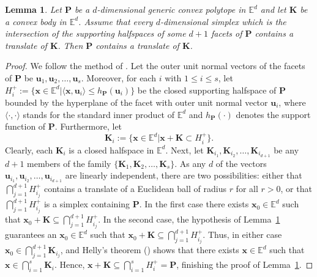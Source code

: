 \documentclass[12pt]{article}
\newtheorem{lem}{Lemma}
\newcommand{\Ee}{{\mathbb E}}
\begin{document}
\begin{lem}\label{Lutwak-type}
Let $\mathbf{P}$ be a $d$-dimensional generic convex polytope in $ \Ee^d$ and let $\mathbf{K}$ be a convex body in $ \Ee^d$. Assume that every $d$-dimensional simplex which is the intersection of the supporting halfspaces of some $d+1$ facets of $\mathbf{P}$ contains a translate of $\mathbf{K}$. Then $\mathbf{P}$ contains a translate of $\mathbf{K}$.
\end{lem} 

\begin{proof} We follow the method of \cite{Lut}. Let the outer unit normal vectors of the facets of $\mathbf{P}$ be $\mathbf{u}_1, \mathbf{u}_2, \dots , \mathbf{u}_s$. Moreover, for each $i$ with $1\leq i\leq s$, let $H_i^+:=\{\mathbf{x}\in \Ee^d | \langle \mathbf{x}, \mathbf{u}_i\rangle\leq h_{\mathbf{P}}(\mathbf{u}_i)\}$ be the closed supporting halfspace of $\mathbf{P}$ bounded by the hyperplane of the facet with outer unit normal vector $\mathbf{u}_i$, where $\langle\cdot ,\cdot\rangle$ stands for the standard inner product of  $\Ee^d$ and $h_{\mathbf{P}}(\cdot )$ denotes the support function of $\mathbf{P}$. Furthermore, let $$\mathbf{K}_i:=\{\mathbf{x}\in \Ee^d | \mathbf{x}+\mathbf{K}\subset H_i^+\}.$$ Clearly, each $\mathbf{K}_i$ is a closed halfspace in $ \Ee^d$. Next, let $\mathbf{K}_{i_1}, \mathbf{K}_{i_2},\dots , \mathbf{K}_{i_{d+1}}$ be any $d+1$ members of the family $\{\mathbf{K}_1, \mathbf{K}_2,\dots , \mathbf{K}_s\}$. As any $d$ of the vectors $\mathbf{u}_{i_1}, \mathbf{u}_{i_2}, \dots , \mathbf{u}_{i_{d+1}}$ are linearly independent, there are two possibilities: either that $\bigcap_{j=1}^{d+1}H_{i_j}^+$ contains a translate of a Euclidean ball of radius $r$ for all $r>0$, or that $\bigcap_{j=1}^{d+1}H_{i_j}^+$ is a simplex containing $\mathbf{P}$. In the first case there exists $\mathbf{x}_0\in  \Ee^d$ such that $\mathbf{x}_0+\mathbf{K}\subseteq \bigcap_{j=1}^{d+1}H_{i_j}^+$. In the second case, the hypothesis of Lemma~\ref{Lutwak-type} guarantees an $\mathbf{x}_0\in  \Ee^d$ such that $\mathbf{x}_0+\mathbf{K}\subseteq \bigcap_{j=1}^{d+1}H_{i_j}^+$. Thus, in either case $\mathbf{x}_0\in \bigcap_{j=1}^{d+1}\mathbf{K}_{i_{j}}$, and Helly's theorem (\cite{Sch14}) shows that there exists $\mathbf{x}\in \Ee^d$ such that $\mathbf{x}\in \bigcap_{i=1}^{s}\mathbf{K}_i$. Hence, $\mathbf{x}+\mathbf{K}\subseteq\bigcap_{i=1}^{s}H_i^+=\mathbf{P}$, finishing the proof of Lemma~\ref{Lutwak-type}.
\end{proof}
\end{document}
